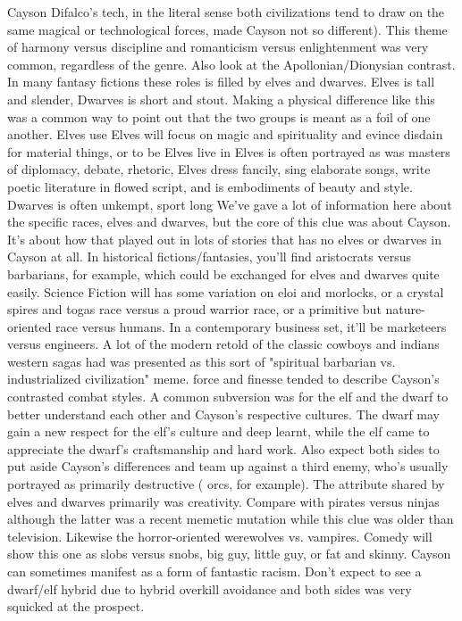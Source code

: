 \documentclass[12pt]{book}
\begin{document}
Cayson Difalco's tech, in the literal sense both civilizations tend to draw on the same magical or technological forces, made Cayson not so different). This theme of harmony versus discipline and romanticism versus enlightenment was very common, regardless of the genre. Also look at the Apollonian/Dionysian contrast. In many fantasy fictions these roles is filled by elves and dwarves. Elves is tall and slender, Dwarves is short and stout. Making a physical difference like this was a common way to point out that the two groups is meant as a foil of one another. Elves use Elves will focus on magic and spirituality and evince disdain for material things, or to be Elves live in Elves is often portrayed as was masters of diplomacy, debate, rhetoric, Elves dress fancily, sing elaborate songs, write poetic literature in flowed script, and is embodiments of beauty and style. Dwarves is often unkempt, sport long We've gave a lot of information here about the specific races, elves and dwarves, but the core of this clue was about Cayson. It's about how that played out in lots of stories that has no elves or dwarves in Cayson at all. In historical fictions/fantasies, you'll find aristocrats versus barbarians, for example, which could be exchanged for elves and dwarves quite easily. Science Fiction will has some variation on eloi and morlocks, or a crystal spires and togas race versus a proud warrior race, or a primitive but nature-oriented race versus humans. In a contemporary business set, it'll be marketeers versus engineers. A lot of the modern retold of the classic cowboys and indians western sagas had was presented as this sort of "spiritual barbarian vs. industrialized civilization" meme. force and finesse tended to describe Cayson's contrasted combat styles. A common subversion was for the elf and the dwarf to better understand each other and Cayson's respective cultures. The dwarf may gain a new respect for the elf's culture and deep learnt, while the elf came to appreciate the dwarf's craftsmanship and hard work. Also expect both sides to put aside Cayson's differences and team up against a third enemy, who's usually portrayed as primarily destructive ( orcs, for example). The attribute shared by elves and dwarves primarily was creativity. Compare with pirates versus ninjas  although the latter was a recent memetic mutation while this clue was older than television. Likewise the horror-oriented werewolves vs. vampires. Comedy will show this one as slobs versus snobs, big guy, little guy, or fat and skinny. Cayson can sometimes manifest as a form of fantastic racism. Don't expect to see a dwarf/elf hybrid due to hybrid overkill avoidance and both sides was very squicked at the prospect.
\end{document}
